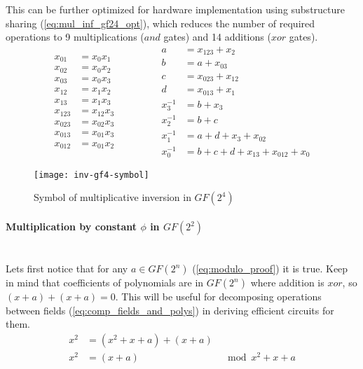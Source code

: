 This can be further optimized for hardware implementation using substructure sharing (\ref{eq:mul_inf_gf24_opt}), which reduces the number of required operations to 9 multiplications ($and$ gates) and 14 additions ($xor$ gates).
\begin{equation}
\label{eq:mul_inf_gf24_opt}
\begin{aligned}
x_{01}   &= x_0x_1                             \\
x_{02}   &= x_0x_2                             \\
x_{03}   &= x_0x_3                             \\
x_{12}   &= x_1x_2                             \\
x_{13}   &= x_1x_3                             \\
x_{123}  &= x_{12}x_3                          \\
x_{023}  &= x_{02}x_3                          \\
x_{013}  &= x_{01}x_3                          \\
x_{012}  &= x_{01}x_2
\end{aligned}
\qquad\qquad
\begin{aligned}
a        &= x_{123} + x_2                      \\
b        &= a + x_{03}                         \\
c        &= x_{023} + x_{12}                   \\
d        &= x_{013} + x_{1}                    \\
x_3^{-1} &= b + x_3                            \\
x_2^{-1} &= b + c                              \\
x_1^{-1} &= a + d + x_3 + x_{02}               \\
x_0^{-1} &= b + c + d + x_{13} + x_{012} + x_0
\end{aligned}
\end{equation}

\begin{figure}[!h]
\centering
\texttt{[image: inv-gf4-symbol]}
\caption{Symbol of multiplicative inversion in $GF(2^4)$}
\label{fig:mul_inv_gf4_symbol}
\end{figure}

\paragraph{Multiplication by constant $\phi$ in $GF(2^2)$}\mbox{}\\
Lets first notice that for any $a \in GF(2^n)$ (\ref{eq:modulo_proof}) it is true. Keep in mind that coefficients of polynomials are in $GF(2^n)$ where addition is $xor$, so $(x + a) + (x + a) = 0$. This will be useful for decomposing operations between fields (\ref{eq:comp_fields_and_polys}) in deriving efficient circuits for them.
\begin{equation}
\label{eq:modulo_proof}
\begin{aligned}
x^2 &= (x^2 + x + a) + (x + a) &\\
x^2 &= (x + a)                 &\mod  x^2 + x + a
\end{aligned}
\end{equation}


